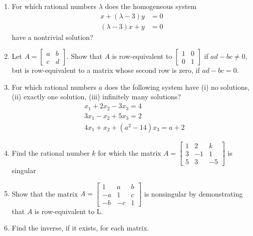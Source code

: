\documentclass[../main.tex]{subfiles}
\begin{document}
\begin{enumerate}[label=\textbf{2.\arabic*}]
\item For which rational numbers $\lambda$ does the homogeneous system
$$\begin{aligned}
	x + (\lambda - 3)y &= 0\\
	(\lambda - 3)x + y &= 0
\end{aligned}$$
have a nontrivial solution?


\item Let $A=\left[\begin{array}{ll}a & b \\ c & d\end{array}\right]$. Show that $A$ is row-equivalent to $\left[\begin{array}{ll}1 & 0 \\ 0 & 1\end{array}\right]$ if $a d-b c \neq 0$, but is row-equivalent to a matrix whose second row is zero, if $a d-b c=0$.

\item For which rational numbers $a$ does the following system have (i) no solutions, (ii) exactly one solution, (iii) infinitely many solutions?
$$
\begin{aligned}
&x_{1}+2 x_{2}-3 x_{3}=4 \\
&3 x_{1}-x_{2}+5 x_{3}=2 \\
&4 x_{1}+x_{2}+\left(a^{2}-14\right) x_{3}=a+2
\end{aligned}
$$

\item Find the rational number $k$ for which the matrix $A=\left[\begin{array}{ccc}1 & 2 & k \\ 3 & -1 & 1 \\ 5 & 3 & -5\end{array}\right]$ is singular


\item Show that the matrix $A=\left[\begin{array}{ccc}1 & a & b \\ -a & 1 & c \\ -b & -c & 1\end{array}\right]$ is nonsingular by demonstrating that $A$ is row-equivalent to $\mathrm{L}$.


\item Find the inverse, if it exists, for each matrix.


\end{enumerate}
\end{document}
